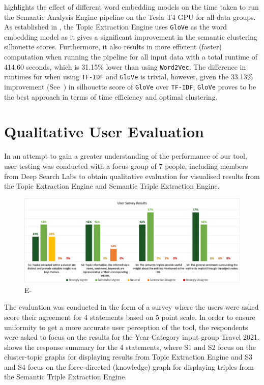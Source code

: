 \vspace{-3ex}
 highlights the effect of different word embedding models on the time taken to run the Semantic Analysis Engine pipeline on the Tesla T4 GPU for all data groups. As established in , the Topic Extraction Engine uses \texttt{GloVe} as the word embedding model as it gives a significant improvement in the semantic clustering silhouette scores. Furthermore, it also results in more efficient (faster) computation when running the pipeline for all input data with a total runtime of 414.60 seconds, which is 31.15\% lower than using \texttt{Word2Vec}. The difference in runtimes for when using \texttt{TF-IDF} and \texttt{GloVe} is trivial, however, given the 33.13\% improvement (See~) in silhouette score of \texttt{GloVe} over \texttt{TF-IDF}, \texttt{GloVe} proves to be the best approach in terms of time efficiency and optimal clustering. 

\section{Qualitative User Evaluation} \label{s:user_eval}
In an attempt to gain a greater understanding of the performance of our tool, user testing was conducted with a focus group of 7 people, including members from Deep Search Labs to obtain qualitative evaluation for visualised results from the Topic Extraction Engine and Semantic Triple Extraction Engine.

\begin{figure}[H]
\centering     %
\includegraphics[width=0.95\linewidth]{images/eval/user_eval.png}
\caption{E-}
\label{user_eval}
\end{figure}

The evaluation was conducted in the form of a survey where the users were asked score their agreement for 4 statements based on 5 point scale. In order to ensure uniformity to get a more accurate user perception of the tool, the respondents were asked to focus on the results for the Year-Category input group Travel 2021.  shows the response summary for the 4 statements, where S1 and S2 focus on the cluster-topic graphs for displaying results from Topic Extraction Engine and S3 and S4 focus on the force-directed (knowledge) graph for displaying triples from the Semantic Triple Extraction Engine. 

